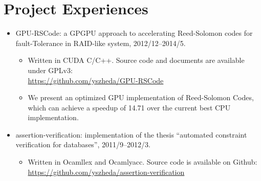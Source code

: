 \documentclass[letterpaper]{article}
\begin{document}
\section*{Project Experiences}
\begin{itemize}
  \item GPU-RSCode: a GPGPU approach to accelerating Reed-Solomon codes for fault-Tolerance in RAID-like system, 2012/12--2014/5.
	\begin{itemize}
	  \item Written in CUDA C/C++. Source code and documents are available under GPLv3: \\ \url{https://github.com/yszheda/GPU-RSCode}
      \item We present an optimized GPU implementation of Reed-Solomon Codes, which can achieve a speedup of 14.71 over the current best CPU implementation.
	\end{itemize}
  \item assertion-verification: implementation of the thesis ``automated constraint verification for databases'', 2011/9--2012/3.
	\begin{itemize}
	  \item Written in Ocamllex and Ocamlyacc. Source code is available on Github: \\ \url{https://github.com/yszheda/assertion-verification}
	\end{itemize}

\end{itemize}
\end{document}
